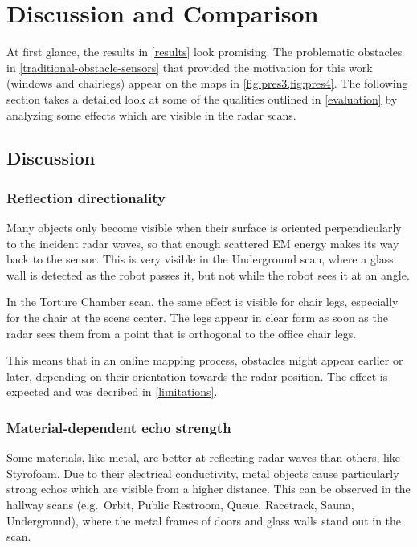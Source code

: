 \chapter{Discussion and Comparison} \label{discussion-and-comparison}

At first glance, the results in \cref{results} look promising. The problematic obstacles in \cref{traditional-obstacle-sensors} that provided the motivation for this work (windows and chairlegs) appear on the maps in \cref{fig:pres3,fig:pres4}. The following section takes a detailed look at some of the qualities outlined in \cref{evaluation} by analyzing some effects which are visible in the radar scans.

\section{Discussion}

\subsection{Reflection directionality} \label{reflection-directionality}

Many objects only become visible when their surface is oriented
perpendicularly to the incident radar waves, so that enough scattered EM
energy makes its way back to the sensor. This is very visible in the
Underground scan, where a glass wall is detected as the robot passes it,
but not while the robot sees it at an angle.

In the Torture Chamber scan, the same effect is visible for chair legs,
especially for the chair at the scene center. The legs appear in clear
form as soon as the radar sees them from a point that is orthogonal
to the office chair legs.

This means that in an online mapping process, obstacles might appear earlier or later, depending on their orientation towards the radar position. The effect is expected and was decribed in \cref{limitations}.


\subsection{Material-dependent echo strength} \label{material-dependent-echo-strength}

Some materials, like metal, are better at reflecting radar
waves than others, like Styrofoam. Due to their electrical conductivity, metal objects cause particularly strong echos which are visible from a higher distance. This can be observed in the hallway scans (e.g.~Orbit, Public Restroom, Queue,
Racetrack, Sauna, Underground), where the metal frames of doors and
glass walls stand out in the scan.

